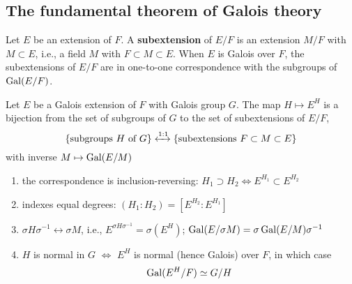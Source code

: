 \documentclass[11pt]{article}
\begin{document}
\subsection{The fundamental theorem of Galois theory}
\label{sec:org5769e6a}
Let \(E\) be an extension of \(F\). A \textbf{subextension} of \(E/F\)  is an extension \(M/F\)
with \(M\subset E\), i.e., a field \(M\) with \(F\subset M\subset E\). When \(E\) is Galois over \(F\), the
subextensions of \(E/F\) are in one-to-one correspondence with the subgroups of \(\operatorname{Gal}(E/F)\).

\begin{theorem}
Let \(E\) be a Galois extension of \(F\) with Galois group \(G\). The map \(H\mapsto E^H\) is a
bijection from the set of subgroups of \(G\) to the set of subextensions of \(E/F\),
\begin{equation*}
\{\text{subgroups $H$ of }G\}\xleftrightarrow{1:1}\{\text{subextensions }F\subset M\subset E\}
\end{equation*}
with inverse \(M\mapsto\operatorname{Gal}(E/M)\)
\begin{enumerate}
\item the correspondence is inclusion-reversing: \(H_1\supset H_2\Leftrightarrow E^{H_1}\subset E^{H_2}\)
\item indexes equal degrees: \((H_1:H_2)=[E^{H_2}:E^{H_1}]\)
\item \(\sigma H\sigma^{-1}\leftrightarrow\sigma M\), i.e., \(E^{\sigma H\sigma^{-1}}=\sigma(E^H)\); \(\operatorname{Gal}(E/\sigma M)=\sigma\operatorname{Gal}(E/M)\sigma^{-1}\)
\item \(H\) is normal in \(G\) \(\Leftrightarrow\) \(E^H\) is normal (hence Galois) over \(F\), in which case
\begin{equation*}
\operatorname{Gal}(E^H/F)\simeq G/H
\end{equation*}
\end{enumerate}
\end{theorem}
\end{document}
